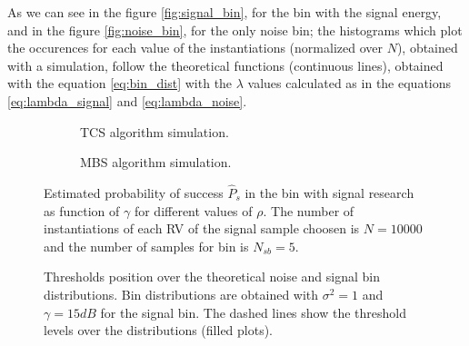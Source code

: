 \documentclass[%
    twoside, 
    a4paper
    ]{article}
\begin{document}
    As we can see in the figure \ref{fig:signal_bin}, for the bin with the signal energy, and in the figure
    \ref{fig:noise_bin}, for the only noise bin; the histograms which plot the occurences for 
    each value of the instantiations (normalized over $N$), obtained with a simulation,
    follow the theoretical functions (continuous lines), obtained with the equation 
    \ref{eq:bin_dist} with the $\lambda$ values calculated as in the equations \ref{eq:lambda_signal} and
    \ref{eq:lambda_noise}.

  \begin{figure}[t]
    \centering
    \begin{subfigure}[t]{0.49\linewidth}
      
      \caption{TCS algorithm simulation.}
      \label{fig:TCS}
    \end{subfigure}
    \begin{subfigure}[t]{0.49\linewidth}
      
      \caption{MBS algorithm simulation.}
      \label{fig:MBS}
    \end{subfigure}
    \caption{Estimated probability of success $\hat{P}_s$ in the bin with signal research as function of $\gamma$ for 
    different values of $\rho$. The number 
    of instantiations of each RV of the signal sample choosen is $N=10000$ and the number of samples for bin is 
    $N_{sb} = 5$.}
  \end{figure}
  \begin{figure}[t]
    \centering
    
    \caption{Thresholds position over the theoretical noise and signal bin distributions. Bin distributions are 
    obtained with $\sigma^2 = 1$ and $\gamma = 15\si{dB}$ for the signal bin.
    The dashed lines show the threshold levels over the distributions (filled plots).}
    \label{fig:TCS_explain1}

  \end{figure}
\end{document}
